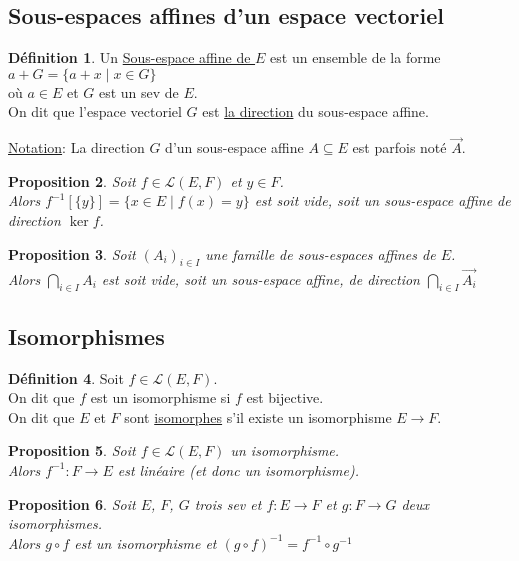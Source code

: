 \documentclass[10pt,a4paper]{article}
\theoremstyle{plain}
\newtheorem{proposition}{Proposition}[section]
\theoremstyle{definition}
\newtheorem{definition}[proposition]{Définition}
\begin{document}
\subsection{Sous-espaces affines d'un espace vectoriel}
\begin{definition}
Un \uline{Sous-espace affine de $E$} est un ensemble de la forme $a + G = \{ a + x \mid x \in G \}$ \\
où $a \in E$ et $G$ est un sev de $E$. \\
On dit que l'espace vectoriel $G$ est \uline{la direction} du sous-espace affine.
\end{definition}

\uline{Notation}: La direction $G$ d'un sous-espace affine $A \subseteq E$ est parfois noté $\vec{A}$.

\begin{proposition}
Soit $f \in \mathcal{L}(E, F)$ et $y \in F$. \\
Alors $f^{-1}[\{y\}] = \{ x \in E \mid f(x) = y \}$ est soit vide, soit un sous-espace affine de direction $\ker f$.
\end{proposition}
\begin{proposition}
Soit $(A_i)_{i \in I}$ une famille de sous-espaces affines de $E$. \\
Alors $\bigcap\limits_{i \in I} A_i$ est soit vide, soit un sous-espace affine, de direction $\bigcap\limits_{i \in I} \vec{A_i}$
\end{proposition}

\subsection{Isomorphismes}
\begin{definition}
Soit $f \in \mathcal{L}(E, F)$. \\
On dit que $f$ est un isomorphisme si $f$ est bijective. \\
On dit que $E$ et $F$ sont \uline{isomorphes} s'il existe un isomorphisme $E \to F$.
\end{definition}
\begin{proposition}
Soit $f \in \mathcal{L}(E, F)$ un isomorphisme. \\
Alors $f^{-1}: F \to E$ est linéaire (et donc un isomorphisme).
\end{proposition}
\begin{proposition}
Soit $E$, $F$, $G$ trois sev et $f: E \to F$ et $g: F \to G$ deux isomorphismes. \\
Alors $g \circ f$ est un isomorphisme et $(g \circ f)^{-1} = f^{-1} \circ g^{-1}$
\end{proposition}
\end{document}
